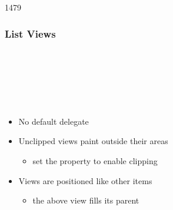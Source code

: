 \begin{slide}{1479}\frametitle{List Views}

\begin{qml}
\\
\\
\\
\\
\\
\qtt{\}}
\end{qml}

\begin{itemize}
  \item No default delegate
  \item Unclipped views paint outside their areas
  \begin{itemize}
  \item set the  property to enable clipping
  \end{itemize}
\item Views are positioned like other items
  \begin{itemize}
  \item the above view fills its parent
  \end{itemize}
\end{itemize}



\end{slide}


